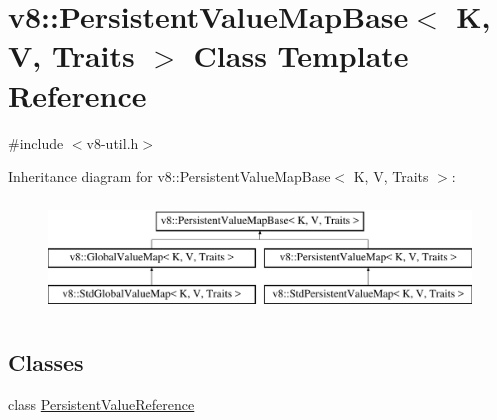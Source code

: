 \hypertarget{classv8_1_1PersistentValueMapBase}{}\section{v8\+:\+:Persistent\+Value\+Map\+Base$<$ K, V, Traits $>$ Class Template Reference}
\label{classv8_1_1PersistentValueMapBase}


{\ttfamily \#include $<$v8-\/util.\+h$>$}

Inheritance diagram for v8\+:\+:Persistent\+Value\+Map\+Base$<$ K, V, Traits $>$\+:\begin{figure}[H]
\begin{center}
\leavevmode
\includegraphics[height=3.000000cm]{classv8_1_1PersistentValueMapBase}
\end{center}
\end{figure}
\subsection*{Classes}
\begin{DoxyCompactItemize}
\item 
class \mbox{\hyperlink{classv8_1_1PersistentValueMapBase_1_1PersistentValueReference}{Persistent\+Value\+Reference}}
\end{DoxyCompactItemize}
